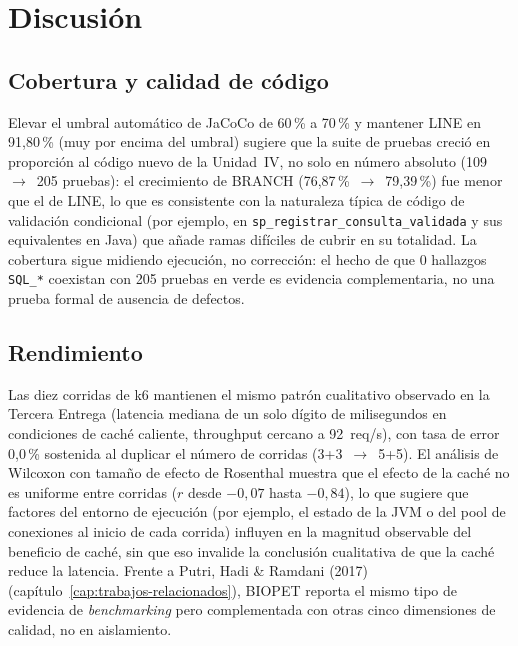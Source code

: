 \chapter{Discusi\'on}
\label{cap:discusion}

\section{Cobertura y calidad de c\'odigo}

Elevar el umbral autom\'atico de JaCoCo de 60\,\% a 70\,\% y mantener LINE
en 91{,}80\,\% (muy por encima del umbral) sugiere que la suite de pruebas
creci\'o en proporci\'on al c\'odigo nuevo de la Unidad~IV, no solo en
n\'umero absoluto (109~$\to$~205 pruebas): el crecimiento de BRANCH
(76{,}87\,\%~$\to$~79{,}39\,\%) fue menor que el de LINE, lo que es
consistente con la naturaleza t\'ipica de c\'odigo de validaci\'on
condicional (por ejemplo, en \texttt{sp\_registrar\_consulta\_validada} y
sus equivalentes en Java) que a\~nade ramas dif\'iciles de cubrir en su
totalidad. La cobertura sigue midiendo ejecuci\'on, no correcci\'on: el
hecho de que 0 hallazgos \texttt{SQL\_*} coexistan con 205 pruebas en verde
es evidencia complementaria, no una prueba formal de ausencia de defectos.

\section{Rendimiento}

Las diez corridas de k6 mantienen el mismo patr\'on cualitativo observado
en la Tercera Entrega (latencia mediana de un solo d\'igito de
milisegundos en condiciones de cach\'e caliente, throughput cercano a
92~req/s), con tasa de error 0{,}0\,\% sostenida al duplicar el n\'umero de
corridas (3+3~$\to$~5+5). El an\'alisis de Wilcoxon con tama\~no de efecto
de Rosenthal muestra que el efecto de la cach\'e no es uniforme entre
corridas ($r$ desde $-0{,}07$ hasta $-0{,}84$), lo que sugiere que factores
del entorno de ejecuci\'on (por ejemplo, el estado de la JVM o del pool de
conexiones al inicio de cada corrida) influyen en la magnitud observable
del beneficio de cach\'e, sin que eso invalide la conclusi\'on cualitativa
de que la cach\'e reduce la latencia. Frente a Putri, Hadi \& Ramdani
(2017)~\cite{putri2017perftesting} (cap\'itulo~\ref{cap:trabajos-relacionados}),
BIOPET reporta el mismo tipo de evidencia de \emph{benchmarking} pero
complementada con otras cinco dimensiones de calidad, no en aislamiento.

